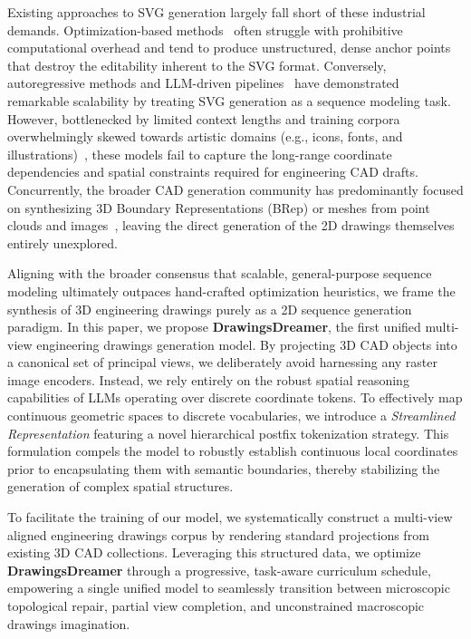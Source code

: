 \documentclass{article}
\begin{document}
Existing approaches to SVG generation largely fall short of these industrial demands. Optimization-based methods~\cite{ma2022towards,li2020differentiable} often struggle with prohibitive computational overhead and tend to produce unstructured, dense anchor points that destroy the editability inherent to the SVG format. Conversely, autoregressive methods and LLM-driven pipelines~\cite{touvron2023llama,achiam2023gpt,yang2025qwen3} have demonstrated remarkable scalability by treating SVG generation as a sequence modeling task. However, bottlenecked by limited context lengths and training corpora overwhelmingly skewed towards artistic domains (e.g., icons, fonts, and illustrations)~\cite{xing2025empowering,rodriguez2025starvector}, these models fail to capture the long-range coordinate dependencies and spatial constraints required for engineering CAD drafts. Concurrently, the broader CAD generation community has predominantly focused on synthesizing 3D Boundary Representations (BRep) or meshes from point clouds and images~\cite{wu2021deepcad,xu2024brepgen}, leaving the direct generation of the 2D drawings themselves entirely unexplored.

Aligning with the broader consensus that scalable, general-purpose sequence modeling ultimately outpaces hand-crafted optimization heuristics, we frame the synthesis of 3D engineering drawings purely as a 2D sequence generation paradigm. In this paper, we propose \textbf{DrawingsDreamer}, the first unified multi-view engineering drawings generation model. By projecting 3D CAD objects into a canonical set of principal views, we deliberately avoid harnessing any raster image encoders. Instead, we rely entirely on the robust spatial reasoning capabilities of LLMs operating over discrete coordinate tokens. To effectively map continuous geometric spaces to discrete vocabularies, we introduce a \textit{Streamlined Representation} featuring a novel hierarchical postfix tokenization strategy. This formulation compels the model to robustly establish continuous local coordinates prior to encapsulating them with semantic boundaries, thereby stabilizing the generation of complex spatial structures.


To facilitate the training of our model, we systematically construct a multi-view aligned engineering drawings corpus by rendering standard projections from existing 3D CAD collections. Leveraging this structured data, we optimize  \textbf{DrawingsDreamer} through a progressive, task-aware curriculum schedule, empowering a single unified model to seamlessly transition between microscopic topological repair, partial view completion, and unconstrained macroscopic drawings imagination.
\end{document}
